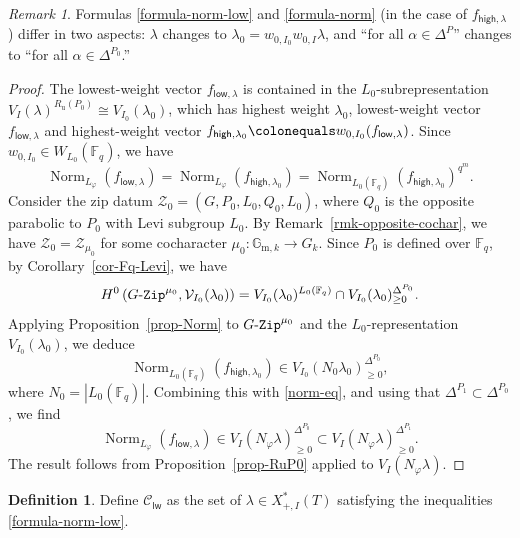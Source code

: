 \documentclass[11pt]{amsart}
\numberwithin{equation}{section}
\theoremstyle{definition}
\newtheorem{definition}[theorem]{Definition}
\theoremstyle{remark}
\newtheorem{rmk}[theorem]{Remark}
\newcommand{\GZip}{\mathop{\text{$G$-{\tt Zip}}}\nolimits}
\newcommand{\lwsf}{\mathsf{lw}}
\newcommand{\low}{\mathsf{low}}
\newcommand{\high}{\mathsf{high}}
\newcommand{\Ccal}{{\mathcal C}}
\newcommand{\Vcal}{{\mathcal V}}
\newcommand{\Zcal}{{\mathcal Z}}
\newcommand{\FF}{\mathbb{F}}
\newcommand{\GG}{\mathbb{G}}
\DeclareMathOperator{\Norm}{Norm}
\begin{document}
\begin{rmk}
Formulas \eqref{formula-norm-low} and \eqref{formula-norm} (in the case of $f_{\high, \lambda}$) differ in two aspects: $\lambda$ changes to $\lambda_0=w_{0,I_0}w_{0,I}\lambda$, and ``for all $\alpha\in \Delta^P$'' changes to ``for all $\alpha \in \Delta^{P_0}$.''
\end{rmk}

\begin{proof}
The lowest-weight vector $f_{\low, \lambda}$ is contained in the $L_0$-subrepresentation $V_I(\lambda)^{R_{\textrm{u}}(P_0)} \cong V_{I_0}(\lambda_0)$, 
which has highest weight $\lambda_0$, lowest-weight vector $f_{\low, \lambda}$ and highest-weight vector $f_{\high,\lambda_0}\colonequals w_{0, I_0}(f_{\low, \lambda})$. Since $w_{0,I_0}\in W_{L_0}(\FF_q)$, we have
\begin{equation}\label{norm-eq}
\Norm_{L_\varphi}\left(f_{\low,\lambda}\right)=\Norm_{L_\varphi}\left(f_{\high,\lambda_0}\right)=\Norm_{L_0(\FF_q)}\left(f_{\high,\lambda_0}\right)^{q^m}.
\end{equation}
Consider the zip datum $\Zcal_0=(G,P_0,L_0,Q_0,L_0)$, where $Q_0$ is the opposite parabolic to $P_0$ with Levi subgroup $L_0$. By Remark~\ref{rmk-opposite-cochar}, we have $\Zcal_0=\Zcal_{\mu_0}$ for some cocharacter $\mu_0\colon \GG_{\textrm{m},k}\to G_k$. Since $P_0$ is defined over $\FF_q$,  by Corollary~\ref{cor-Fq-Levi}, we have 
\begin{equation}
H^0\left(\GZip^{\mu_0},\Vcal_{I_0}(\lambda_0)\right)=V_{I_0}(\lambda_0)^{L_0(\FF_q)}\cap V_{I_0}(\lambda_0)^{\Delta^{P_0}}_{\geq 0}.   
\end{equation}
Applying Proposition~\ref{prop-Norm} to $\GZip^{\mu_0}$ and the $L_0$-representation $V_{I_0}(\lambda_0)$, we deduce 
\[\Norm_{L_0(\FF_q)}\left(f_{\high,\lambda_0}\right)\in V_{I_0}(N_0\lambda_0)^{\Delta^{P_0}}_{\geq 0}, 
\] 
where $N_0=|L_0(\FF_q)|$. Combining this with \eqref{norm-eq}, and using that $\Delta^{P_1}\subset \Delta^{P_0}$, we find
\begin{equation}
    \Norm_{L_\varphi}\left(f_{\low,\lambda}\right) \in  V_I\left(N_\varphi\lambda\right)_{\geq 0}^{\Delta^{P_0}} \subset V_I(N_\varphi\lambda)_{\geq 0}^{\Delta^{P_1}}.
\end{equation}
The result follows from Proposition~\ref{prop-RuP0} applied to $V_I(N_\varphi \lambda)$.
\end{proof}

\begin{definition}
Define $\Ccal_{\lwsf}$ as the set of $\lambda \in X^*_{+,I}(T)$ satisfying the inequalities \eqref{formula-norm-low}.
\end{definition}
\end{document}
